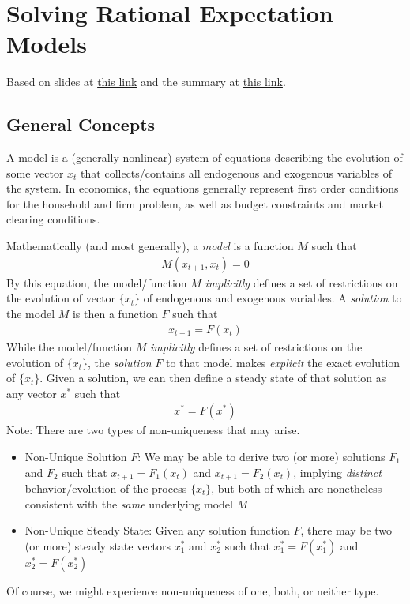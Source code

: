 \documentclass[12pt]{article}
\theoremstyle{plain}
\theoremstyle{definition}
\theoremstyle{remark}
\begin{document}
\clearpage
\section{Solving Rational Expectation Models}

Based on slides at
\href{http://www.wouterdenhaan.com/numerical/BKconditionsslides.pdf}{%
  this link}
and the summary at
\href{http://www.robertopancrazi.com/LN3_solving_lrem.pdf}{%
  this link}.

\subsection{General Concepts}

A model is a (generally nonlinear) system of equations describing the
evolution of some vector $x_t$ that collects/contains all endogenous and
exogenous variables of the system.
In economics, the equations generally represent first order conditions
for the household and firm problem, as well as budget constraints and
market clearing conditions.

Mathematically (and most generally), a \emph{model} is a function $M$
such that
\begin{align*}
  M(x_{t+1},x_t)=0
\end{align*}
By this equation, the model/function $M$ \emph{implicitly} defines a set
of restrictions on the evolution of vector $\{x_t\}$ of endogenous and
exogenous variables.
A \emph{solution} to the model $M$ is then a function $F$ such that
\begin{align*}
  x_{t+1}
  = F(x_t)
\end{align*}
While the model/function $M$ \emph{implicitly} defines a set of
restrictions on the evolution of $\{x_t\}$, the \emph{solution} $F$ to
that model makes \emph{explicit} the exact evolution of $\{x_t\}$.
Given a solution, we can then define a steady state of that
solution as any vector $x^*$ such that
\begin{align*}
  x^* = F(x^*)
\end{align*}
Note: There are two types of non-uniqueness that may arise.
\begin{itemize}
  \item Non-Unique Solution $F$:
    We may be able to derive two (or more) solutions $F_1$ and $F_2$
    such that $x_{t+1}=F_1(x_t)$ and $x_{t+1}=F_2(x_t)$,
    implying \emph{distinct} behavior/evolution of the process
    $\{x_t\}$, but both of which are nonetheless consistent with the
    \emph{same} underlying model $M$
  \item Non-Unique Steady State:
    Given any solution function $F$, there may be two (or more) steady
    state vectors $x_1^*$ and $x_2^*$ such that
    $x_1^*=F(x_1^*)$ and $x_2^*=F(x_2^*)$
\end{itemize}
Of course, we might experience non-uniqueness of one, both, or neither
type.
\end{document}
